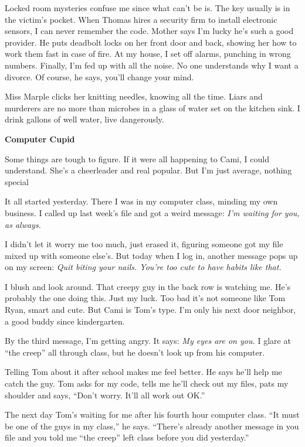 \documentclass[
]{article}
\begin{document}
Locked room mysteries confuse me since what can't be is. The key usually
is in the victim's pocket. When Thomas hires a security firm to install
electronic sensors, I can never remember the code. Mother says I'm lucky
he's such a good provider. He puts deadbolt locks on her front door and
back, showing her how to work them fast in case of fire. At my house, I
set off alarms, punching in wrong numbers. Finally, I'm fed up with all
the noise. No one understands why I want a divorce. Of course, he says,
you'll change your mind.

Miss Marple clicks her knitting needles, knowing all the time. Liars and
murderers are no more than microbes in a glass of water set on the
kitchen sink. I drink gallons of well water, live dangerously.

\textbf{\hfill\break
}

\textbf{Computer Cupid}

Some things are tough to figure. If it were all happening to Cami, I
could understand. She's a cheerleader and real popular. But I'm just
average, nothing special

It all started yesterday. There I was in my computer class, minding my
own business. I called up last week's file and got a weird message:
\emph{I'm waiting for you, as always.}

I didn't let it worry me too much, just erased it, figuring someone got
my file mixed up with someone else's. But today when I log in, another
message pops up on my screen: \emph{Quit biting your nails. You're too
cute to have habits like that.}

I blush and look around. That creepy guy in the back row is watching me.
He's probably the one doing this. Just my luck. Too bad it's not someone
like Tom Ryan, smart and cute. But Cami is Tom's type. I'm only his next
door neighbor, a good buddy since kindergarten.

By the third message, I'm getting angry. It says: \emph{My eyes are on
you.} I glare at ``the creep'' all through class, but he doesn't look up
from his computer.

Telling Tom about it after school makes me feel better. He says he'll
help me catch the guy. Tom asks for my code, tells me he'll check out my
files, pats my shoulder and says, ``Don't worry. It'll all work out
OK.''

The next day Tom's waiting for me after his fourth hour computer class.
``It must be one of the guys in my class,'' he says. ``There's already
another message in you file and you told me ``the creep'' left class
before you did yesterday.''
\end{document}

